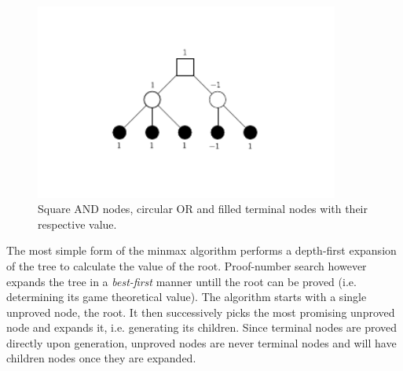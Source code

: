 \documentclass{article}
\begin{document}
\begin{figure}[h]
\center
\includegraphics[width=10cm]{simpleminmax.pdf}
\caption{Square AND nodes, circular OR and filled terminal nodes with their respective value.}
\label{tree:simple}
\end{figure}

The most simple form of the minmax algorithm performs a depth-first expansion of the tree to calculate the value of the root. Proof-number search however
expands the tree in a \textit{best-first} manner untill the root can be proved (i.e. determining its game theoretical value). The algorithm starts with a single
unproved node, the root. It then successively picks the most promising unproved node and expands it, i.e. generating its children. Since terminal nodes are proved
directly upon generation, unproved nodes are never terminal nodes and will have children nodes once they are expanded. 
\end{document}
